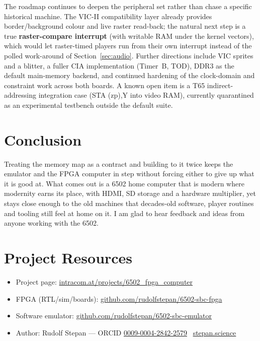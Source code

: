 \documentclass[11pt,a4paper]{article}
\newcommand{\reg}[1]{{\ttfamily #1}}
\begin{document}
The roadmap continues to deepen the peripheral set rather than chase a
specific historical machine. The VIC-II compatibility layer already
provides border/background colour and live raster read-back; the natural
next step is a true \textbf{raster-compare interrupt} (with writable RAM
under the kernel vectors), which would let raster-timed players run from
their own interrupt instead of the polled work-around of
Section~\ref{sec:audio}. Further directions include VIC sprites and a
blitter, a fuller CIA implementation (Timer~B, TOD), DDR3 as the default
main-memory backend, and continued hardening of the clock-domain and
constraint work across both boards. A known open item is a T65
indirect-addressing integration case (\reg{STA (zp),Y} into video RAM),
currently quarantined as an experimental testbench outside the default
suite.

\section{Conclusion}

Treating the memory map as a contract and building to it twice keeps the
emulator and the FPGA computer in step without forcing either to give up
what it is good at. What comes out is a 6502 home computer that is modern
where modernity earns its place, with HDMI, SD storage and a hardware
multiplier, yet stays close enough to the old machines that decades-old
software, player routines and tooling still feel at home on it. I am glad
to hear feedback and ideas from anyone working with the 6502.

\section*{Project Resources}
\begin{itemize}[leftmargin=1.4em,itemsep=0.15em]
  \item Project page: \href{https://intracom.at/projects/6502_fpga_computer/}{intracom.at/projects/6502\_fpga\_computer}
  \item FPGA (RTL/sim/boards): \href{https://github.com/rudolfstepan/6502-sbc-fpga}{github.com/rudolfstepan/6502-sbc-fpga}
  \item Software emulator: \href{https://github.com/rudolfstepan/6502-sbc-emulator}{github.com/rudolfstepan/6502-sbc-emulator}
  \item Author: Rudolf Stepan --- ORCID \href{https://orcid.org/0009-0004-2842-2579}{0009-0004-2842-2579} \textbullet\ \href{https://stepan.science}{stepan.science}
\end{itemize}
\end{document}
